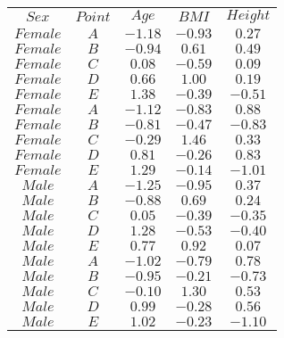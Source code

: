 \begin{tabular}{ccccc}
$Sex$ & $Point$ & $Age$ & $BMI$ & $Height$\\
$Female$ & $A$ & $-1.18$ & $-0.93$ & $0.27$\\
$Female$ & $B$ & $-0.94$ & $0.61$ & $0.49$\\
$Female$ & $C$ & $0.08$ & $-0.59$ & $0.09$\\
$Female$ & $D$ & $0.66$ & $1.00$ & $0.19$\\
$Female$ & $E$ & $1.38$ & $-0.39$ & $-0.51$\\
$Female$ & $A$ & $-1.12$ & $-0.83$ & $0.88$\\
$Female$ & $B$ & $-0.81$ & $-0.47$ & $-0.83$\\
$Female$ & $C$ & $-0.29$ & $1.46$ & $0.33$\\
$Female$ & $D$ & $0.81$ & $-0.26$ & $0.83$\\
$Female$ & $E$ & $1.29$ & $-0.14$ & $-1.01$\\
$Male$ & $A$ & $-1.25$ & $-0.95$ & $0.37$\\
$Male$ & $B$ & $-0.88$ & $0.69$ & $0.24$\\
$Male$ & $C$ & $0.05$ & $-0.39$ & $-0.35$\\
$Male$ & $D$ & $1.28$ & $-0.53$ & $-0.40$\\
$Male$ & $E$ & $0.77$ & $0.92$ & $0.07$\\
$Male$ & $A$ & $-1.02$ & $-0.79$ & $0.78$\\
$Male$ & $B$ & $-0.95$ & $-0.21$ & $-0.73$\\
$Male$ & $C$ & $-0.10$ & $1.30$ & $0.53$\\
$Male$ & $D$ & $0.99$ & $-0.28$ & $0.56$\\
$Male$ & $E$ & $1.02$ & $-0.23$ & $-1.10$\\
\end{tabular}
